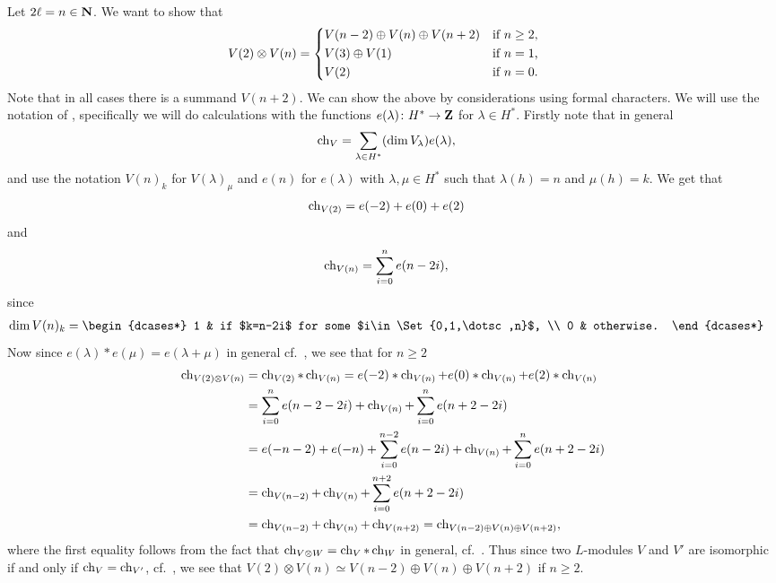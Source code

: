 Let $2\ell=n\in\mathbf{N}$. We want to show that
\begin{align}\label{eq:V(2)tensorV(n)}
  V(2)\otimes V(n) &=
                     \begin{dcases*}
                       V(n-2) \oplus V(n) \oplus V(n+2) & if $n\geq 2$,\\
                       V(3)\oplus V(1) & if $n=1$, \\
                       V(2) & if $n=0$.
                     \end{dcases*}
\end{align}
Note that in all cases there is a summand $V(n+2)$. We can show the above by considerations using formal characters. We will use the notation of \cite[Chapter~8]{jantzen}, specifically we will do calculations with the functions $e(\lambda)\colon H^*\to \mathbf{Z}$ for $\lambda\in H^*$. Firstly note that in general
\begin{align*}
  \operatorname{ch}_V &= \sum_{\lambda\in H^*} (\dim V_\lambda) e(\lambda),
\end{align*}
and use the notation $V(n)_k$ for $V(\lambda)_\mu$ and $e(n)$ for $e(\lambda)$ with $\lambda,\mu\in H^*$ such that $\lambda(h)=n$ and $\mu(h)=k$. We get that
\begin{align*}
  \operatorname{ch}_{V(2)} &= e(-2) + e(0) + e(2)
\end{align*}
and 
\begin{align*}
  \operatorname{ch}_{V(n)} &= \sum_{i=0}^n e(n-2i),
\end{align*}
since
\begin{align*}
  \dim V(n)_k &=
                \begin{dcases*}
                  1 & if $k=n-2i$ for some $i\in\Set{0,1,\dotsc,n}$, \\
                  0 & otherwise.
                \end{dcases*}
\end{align*}
Now since $e(\lambda)*e(\mu)=e(\lambda+\mu)$ in general cf.\ \cite[93]{jantzen}, we see that for $n\geq 2$
\begin{align*}
  \operatorname{ch}_{V(2)\otimes V(n)} &= \operatorname{ch}_{V(2)} * \operatorname{ch}_{V(n)} = e(-2)*\operatorname{ch}_{V(n)} + e(0)*\operatorname{ch}_{V(n)} + e(2)*\operatorname{ch}_{V(n)} \\
                         &= \sum_{i=0}^n e(n-2-2i) + \operatorname{ch}_{V(n)} + \sum_{i=0}^n e(n+2-2i) \\
                         &= e(-n-2)+e(-n) + \sum_{i=0}^{n-2} e(n-2i) + \operatorname{ch}_{V(n)} + \sum_{i=0}^n e(n+2-2i) \\
                         &= \operatorname{ch}_{V(n-2)} + \operatorname{ch}_{V(n)} + \sum_{i=0}^{n+2} e(n+2-2i) \\
  &= \operatorname{ch}_{V(n-2)} + \operatorname{ch}_{V(n)} + \operatorname{ch}_{V(n+2)} = \operatorname{ch}_{V(n-2)\oplus V(n)\oplus V(n+2)},
\end{align*}
where the first equality follows from the fact that $\operatorname{ch}_{V\otimes W}=\operatorname{ch}_V * \operatorname{ch}_W$ in general, cf.\ \cite[125]{humphrey}. Thus since two $L$-modules $V$ and $V'$ are isomorphic if and only if $\operatorname{ch}_V=\operatorname{ch}_{V'}$, cf.\ \cite[90]{jantzen}, we see that $V(2)\otimes V(n) \simeq V(n-2)\oplus V(n)\oplus V(n+2)$ if $n\geq 2$.

